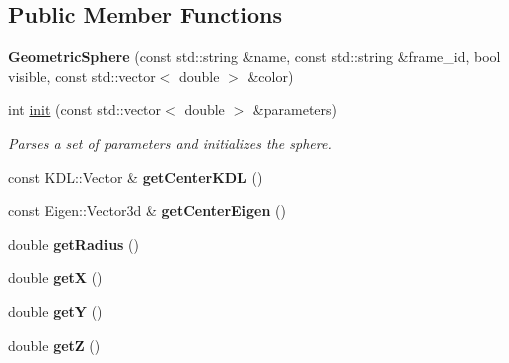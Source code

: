 \subsection*{Public Member Functions}
\begin{DoxyCompactItemize}
\item 
\hypertarget{classhiqp_1_1geometric__primitives_1_1GeometricSphere_a79a504eeb43a92782b9977dfaabc46de}{{\bfseries Geometric\-Sphere} (const std\-::string \&name, const std\-::string \&frame\-\_\-id, bool visible, const std\-::vector$<$ double $>$ \&color)}\label{classhiqp_1_1geometric__primitives_1_1GeometricSphere_a79a504eeb43a92782b9977dfaabc46de}

\item 
int \hyperlink{classhiqp_1_1geometric__primitives_1_1GeometricSphere_aa291157616f08f80ded39aa29cd3589a}{init} (const std\-::vector$<$ double $>$ \&parameters)
\begin{DoxyCompactList}\small\item\em Parses a set of parameters and initializes the sphere. \end{DoxyCompactList}\item 
\hypertarget{classhiqp_1_1geometric__primitives_1_1GeometricSphere_ab56e9bf7f22278e100f740e4ff95dc6d}{const K\-D\-L\-::\-Vector \& {\bfseries get\-Center\-K\-D\-L} ()}\label{classhiqp_1_1geometric__primitives_1_1GeometricSphere_ab56e9bf7f22278e100f740e4ff95dc6d}

\item 
\hypertarget{classhiqp_1_1geometric__primitives_1_1GeometricSphere_a7003d1beed56d74545ad701bb8c267e2}{const Eigen\-::\-Vector3d \& {\bfseries get\-Center\-Eigen} ()}\label{classhiqp_1_1geometric__primitives_1_1GeometricSphere_a7003d1beed56d74545ad701bb8c267e2}

\item 
\hypertarget{classhiqp_1_1geometric__primitives_1_1GeometricSphere_a2ed658030d5679dfb61546b081719170}{double {\bfseries get\-Radius} ()}\label{classhiqp_1_1geometric__primitives_1_1GeometricSphere_a2ed658030d5679dfb61546b081719170}

\item 
\hypertarget{classhiqp_1_1geometric__primitives_1_1GeometricSphere_a0a861789beade3d8b897448cb3ed8bd9}{double {\bfseries get\-X} ()}\label{classhiqp_1_1geometric__primitives_1_1GeometricSphere_a0a861789beade3d8b897448cb3ed8bd9}

\item 
\hypertarget{classhiqp_1_1geometric__primitives_1_1GeometricSphere_a773735994c0f1f0341e71669f146118d}{double {\bfseries get\-Y} ()}\label{classhiqp_1_1geometric__primitives_1_1GeometricSphere_a773735994c0f1f0341e71669f146118d}

\item 
\hypertarget{classhiqp_1_1geometric__primitives_1_1GeometricSphere_a2340c72ca73f5a424fd831c084430ba6}{double {\bfseries get\-Z} ()}\label{classhiqp_1_1geometric__primitives_1_1GeometricSphere_a2340c72ca73f5a424fd831c084430ba6}

\end{DoxyCompactItemize}
